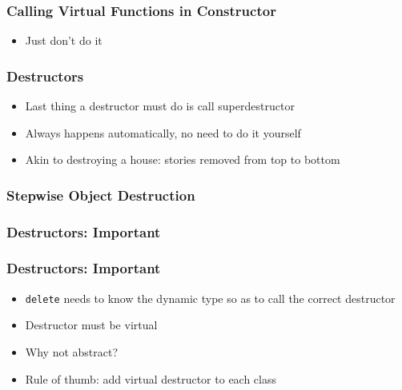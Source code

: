 \begin{frame}
  \frametitle{Calling Virtual Functions in Constructor}
  \begin{itemize}
    \item Just don't do it
  \end{itemize}
\end{frame}

\begin{frame}
  \frametitle{Destructors}
  \begin{itemize}
    \item Last thing a destructor must do is call superdestructor
    \item Always happens automatically, no need to do it yourself
    \item Akin to destroying a house: stories removed from top to bottom
  \end{itemize}
\end{frame}

\begin{frame}
  \frametitle{Stepwise Object Destruction}
  \begin{center}
  \end{center}
\end{frame}

\begin{frame}
  \frametitle{Destructors: Important}
\end{frame}

\begin{frame}
  \frametitle{Destructors: Important}
  \begin{itemize}
    \item {\tt delete} needs to know the dynamic type so as to
          call the correct destructor
    \item Destructor must be virtual
          \vskip2mm
    \item Why not abstract? \cake
          \vskip2mm
    \item Rule of thumb: add virtual destructor to each class
  \end{itemize}
\end{frame}

